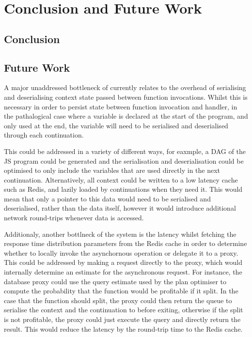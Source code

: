 \chapter{Conclusion and Future Work}
\label{chap:conclusion}
\section{Conclusion}

\section{Future Work}
\label{sec:future-work}

A major unaddressed bottleneck of \faaas{} currently relates to the overhead of serialising and deserialising context state passed between function invocations. Whilst this is necessary in order to persist state between function invocation and handler, in the pathalogical case where a variable is declared at the start of the program, and only used at the end, the variable will need to be serialised and deserialised through each continuation.

This could be addressed in a variety of different ways, for eaxmple, a DAG of the JS program could be generated and the serialisation and deserialisation could be optimised to only include the variables that are used directly in the next continuation. Alternatively, all context could be written to a low latency cache such as Redis, and lazily loaded by continuations when they need it. This would mean that only a pointer to this data would need to be serialised and deserialised, rather than the data itself, however it would introduce additional network round-trips whenever data is accessed.

Additionaly, another bottlneck of the system is the latency whilst fetching the response time distribution parameters from the Redis cache in order to determine whether to locally invoke the asynchornous operation or delegate it to a proxy. This could be addressed by making a request directly to the proxy, which would internally determine an estimate for the asynchronous request. For instance, the database proxy could use the query estimate used by the plan optimiser to compute the probability that the function would be profitable if it split. In the case that the function should split, the proxy could then return the queue to serialise the context and the continuation to before exiting, otherwise if the split is not profitable, the proxy could just execute the query and directly return the result. This would reduce the latency by the round-trip time to the Redis cache.
